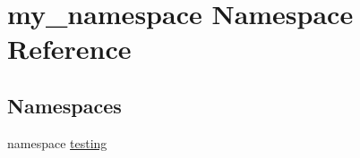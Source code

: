 \hypertarget{namespacemy__namespace}{\section{my\-\_\-namespace \-Namespace \-Reference}
\label{d4/d0f/namespacemy__namespace}
}
\subsection*{\-Namespaces}
\begin{DoxyCompactItemize}
\item 
namespace \hyperlink{namespacemy__namespace_1_1testing}{testing}
\end{DoxyCompactItemize}
